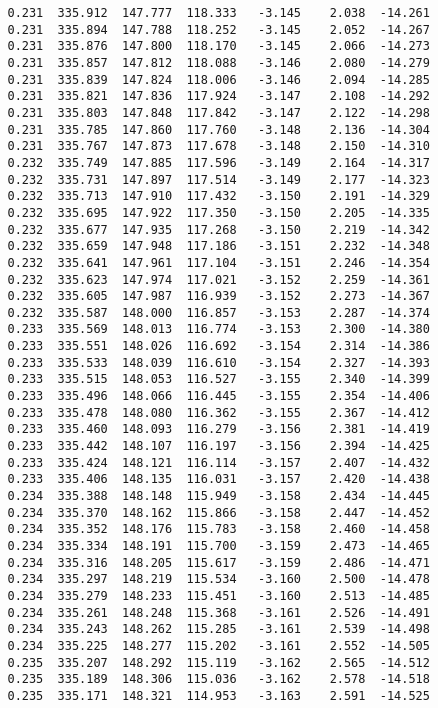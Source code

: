 \begin{verbatim}
   0.231  335.912  147.777  118.333   -3.145    2.038  -14.261
   0.231  335.894  147.788  118.252   -3.145    2.052  -14.267
   0.231  335.876  147.800  118.170   -3.145    2.066  -14.273
   0.231  335.857  147.812  118.088   -3.146    2.080  -14.279
   0.231  335.839  147.824  118.006   -3.146    2.094  -14.285
   0.231  335.821  147.836  117.924   -3.147    2.108  -14.292
   0.231  335.803  147.848  117.842   -3.147    2.122  -14.298
   0.231  335.785  147.860  117.760   -3.148    2.136  -14.304
   0.231  335.767  147.873  117.678   -3.148    2.150  -14.310
   0.232  335.749  147.885  117.596   -3.149    2.164  -14.317
   0.232  335.731  147.897  117.514   -3.149    2.177  -14.323
   0.232  335.713  147.910  117.432   -3.150    2.191  -14.329
   0.232  335.695  147.922  117.350   -3.150    2.205  -14.335
   0.232  335.677  147.935  117.268   -3.150    2.219  -14.342
   0.232  335.659  147.948  117.186   -3.151    2.232  -14.348
   0.232  335.641  147.961  117.104   -3.151    2.246  -14.354
   0.232  335.623  147.974  117.021   -3.152    2.259  -14.361
   0.232  335.605  147.987  116.939   -3.152    2.273  -14.367
   0.232  335.587  148.000  116.857   -3.153    2.287  -14.374
   0.233  335.569  148.013  116.774   -3.153    2.300  -14.380
   0.233  335.551  148.026  116.692   -3.154    2.314  -14.386
   0.233  335.533  148.039  116.610   -3.154    2.327  -14.393
   0.233  335.515  148.053  116.527   -3.155    2.340  -14.399
   0.233  335.496  148.066  116.445   -3.155    2.354  -14.406
   0.233  335.478  148.080  116.362   -3.155    2.367  -14.412
   0.233  335.460  148.093  116.279   -3.156    2.381  -14.419
   0.233  335.442  148.107  116.197   -3.156    2.394  -14.425
   0.233  335.424  148.121  116.114   -3.157    2.407  -14.432
   0.233  335.406  148.135  116.031   -3.157    2.420  -14.438
   0.234  335.388  148.148  115.949   -3.158    2.434  -14.445
   0.234  335.370  148.162  115.866   -3.158    2.447  -14.452
   0.234  335.352  148.176  115.783   -3.158    2.460  -14.458
   0.234  335.334  148.191  115.700   -3.159    2.473  -14.465
   0.234  335.316  148.205  115.617   -3.159    2.486  -14.471
   0.234  335.297  148.219  115.534   -3.160    2.500  -14.478
   0.234  335.279  148.233  115.451   -3.160    2.513  -14.485
   0.234  335.261  148.248  115.368   -3.161    2.526  -14.491
   0.234  335.243  148.262  115.285   -3.161    2.539  -14.498
   0.234  335.225  148.277  115.202   -3.161    2.552  -14.505
   0.235  335.207  148.292  115.119   -3.162    2.565  -14.512
   0.235  335.189  148.306  115.036   -3.162    2.578  -14.518
   0.235  335.171  148.321  114.953   -3.163    2.591  -14.525

\end{verbatim}
